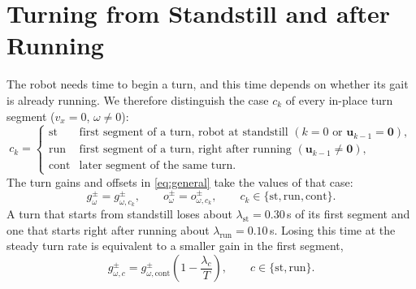 \documentclass[11pt]{article}
\begin{document}
\section{Turning from Standstill and after Running}
The robot needs time to begin a turn, and this time depends on whether its gait is already running.
We therefore distinguish the case $c_k$ of every in-place turn segment ($v_x = 0$, $\omega \neq 0$):
\begin{equation}
  c_k =
  \begin{cases}
    \mathrm{st} & \text{first segment of a turn, robot at standstill } (k = 0 \text{ or } \mathbf{u}_{k-1} = \mathbf{0}),\\
    \mathrm{run} & \text{first segment of a turn, right after running } (\mathbf{u}_{k-1} \neq \mathbf{0}),\\
    \mathrm{cont} & \text{later segment of the same turn}.
  \end{cases}
\end{equation}
The turn gains and offsets in \eqref{eq:general} take the values of that case:
\begin{equation}
  g_\omega^{\pm} = g_{\omega,c_k}^{\pm}, \qquad o_\omega^{\pm} = o_{\omega,c_k}^{\pm},
  \qquad c_k \in \{\mathrm{st}, \mathrm{run}, \mathrm{cont}\}.
\end{equation}
A turn that starts from standstill loses about $\lambda_{\mathrm{st}} = 0.30$\,s of its first segment and one that starts right after running about $\lambda_{\mathrm{run}} = 0.10$\,s.
Losing this time at the steady turn rate is equivalent to a smaller gain in the first segment,
\begin{equation}
  g_{\omega,c}^{\pm} = g_{\omega,\mathrm{cont}}^{\pm}\left(1 - \frac{\lambda_c}{T}\right),
  \qquad c \in \{\mathrm{st}, \mathrm{run}\}.
\end{equation}
\end{document}
